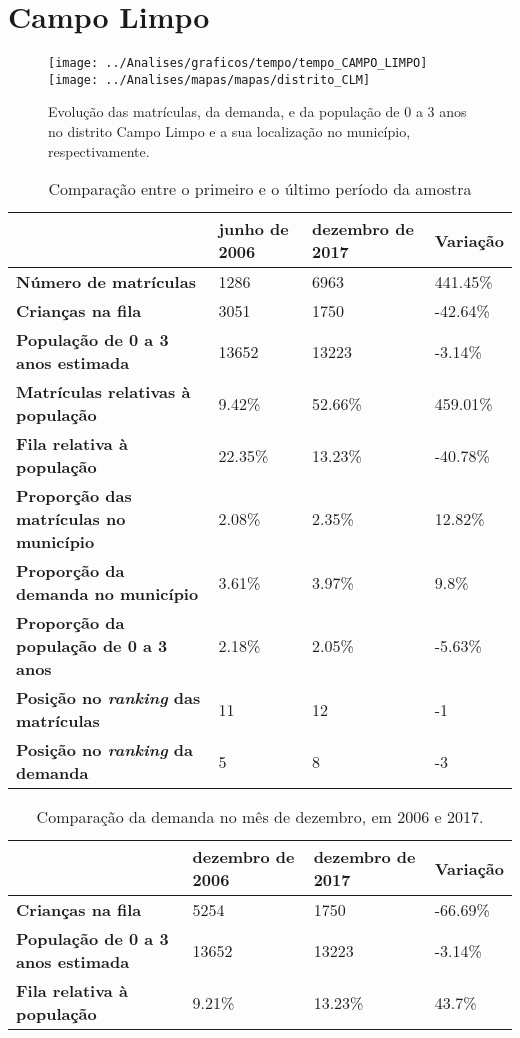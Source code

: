 \section{Campo Limpo}
\begin{figure}[H]
\centering
\texttt{[image: ../Analises/graficos/tempo/tempo\_CAMPO\_LIMPO]}
\texttt{[image: ../Analises/mapas/mapas/distrito\_CLM]}
\caption{Evolução das matrículas, da demanda, e da população de 0 a 3 anos no distrito Campo Limpo e a sua localização no município, respectivamente.}
\end{figure}
\begin{table}[H]
\begin{tabular}{l|l|l|l}
\textbf{}                                      & \textbf{junho de 2006}       & \textbf{dezembro de 2017}    & \textbf{Variação} \\ \hline
\textbf{Número de matrículas}                  & 1286 & 6963 & 441.45\% \\ \hline
\textbf{Crianças na fila}                      & 3051 & 1750 & -42.64\% \\ \hline
\textbf{População de 0 a 3 anos estimada}      & 13652 & 13223 & -3.14\% \\ \hline
\textbf{Matrículas relativas à população}      & 9.42\% & 52.66\% & 459.01\% \\ \hline
\textbf{Fila relativa à população}             & 22.35\% & 13.23\% & -40.78\% \\ \hline
\textbf{Proporção das matrículas no município} & 2.08\% & 2.35\% & 12.82\% \\ \hline
\textbf{Proporção da demanda no município}     & 3.61\% & 3.97\% & 9.8\% \\ \hline
\textbf{Proporção da população de 0 a 3 anos}  & 2.18\% & 2.05\% & -5.63\% \\ \hline
\textbf{Posição no \textit{ranking} das matrículas}     & 11 & 12 & -1 \\ \hline
\textbf{Posição no \textit{ranking} da demanda}         & 5 & 8 & -3 \\ 
\end{tabular}
\caption{Comparação entre o primeiro e o último período da amostra}
\end{table}
\begin{table}[H]
\begin{tabular}{l|l|l|l}
\textbf{}                                 & \textbf{dezembro de 2006} & \textbf{dezembro de 2017} & \textbf{Variação} \\ \hline
\textbf{Crianças na fila}                      & 5254 & 1750 & -66.69\% \\ \hline
\textbf{População de 0 a 3 anos estimada}      & 13652 & 13223 & -3.14\% \\ \hline
\textbf{Fila relativa à população}             & 9.21\% & 13.23\% & 43.7\% \\
\end{tabular}
\caption{Comparação da demanda no mês de dezembro, em 2006 e 2017.}
\end{table}
